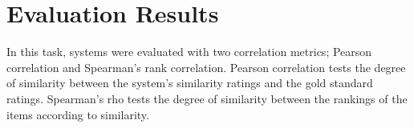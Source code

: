 \documentclass[11pt]{article}
\begin{document}


\section{Evaluation Results}
\label{evaluation}

In this task, systems were evaluated with two correlation metrics; Pearson correlation and Spearman's rank correlation.  Pearson correlation tests the degree of similarity between the system's similarity ratings and the gold standard ratings.  Spearman's rho tests the degree of similarity between the rankings of the items according to similarity.
\end{document}

